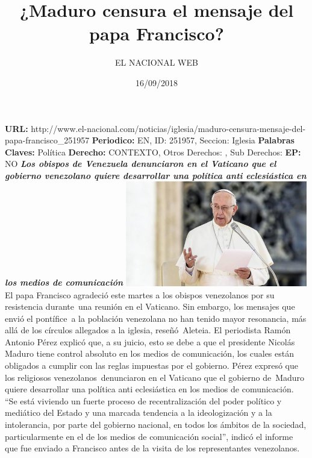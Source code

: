 \documentclass{article}%
\title{\textbf{¿Maduro censura el mensaje del papa Francisco?}}%
\author{EL NACIONAL WEB}%
\date{16/09/2018}%
\begin{document}
%
\normalsize%
\maketitle%
\textbf{URL: }%
http://www.el{-}nacional.com/noticias/iglesia/maduro{-}censura{-}mensaje{-}del{-}papa{-}francisco\_251957\newline%
%
\textbf{Periodico: }%
EN, %
ID: %
251957, %
Seccion: %
Iglesia\newline%
%
\textbf{Palabras Claves: }%
Política\newline%
%
\textbf{Derecho: }%
CONTEXTO, %
Otros Derechos: %
, %
Sub Derechos: %
\newline%
%
\textbf{EP: }%
NO\newline%
\newline%
%
\textbf{\textit{Los obispos de Venezuela denunciaron en el Vaticano que el gobierno venezolano quiere desarrollar una política anti eclesiástica en los medios de comunicación}}%
\newline%
\newline%
%
\includegraphics[width=300px]{179.jpg}%
\newline%
%
El papa Francisco agradeció este martes a los obispos venezolanos por su resistencia durante~una reunión en el Vaticano. Sin embargo, los mensajes que envió el pontífice~a la población venezolana no han tenido mayor resonancia, más allá de los círculos allegados a la iglesia, reseñó~Aleteia.%
\newline%
%
El periodista Ramón Antonio Pérez explicó que, a su juicio, esto se debe a que el presidente Nicolás Maduro tiene control absoluto en los medios de comunicación, los cuales están obligados a cumplir con las reglas impuestas por el gobierno.%
\newline%
%
Pérez expresó que los religiosos venezolanos~denunciaron en el Vaticano que el gobierno de~Maduro quiere desarrollar una política anti eclesiástica en los medios de comunicación.%
\newline%
%
“Se está viviendo un fuerte proceso de recentralización del poder político y mediático del Estado y una marcada tendencia a la ideologización y a la intolerancia, por parte del gobierno nacional, en todos los ámbitos de la sociedad, particularmente en el de los medios de comunicación social”, indicó el informe que fue enviado a Francisco antes de la visita de los representantes venezolanos.%
\end{document}
